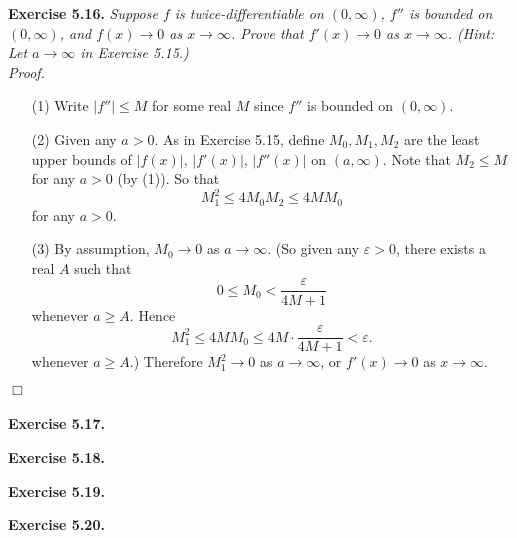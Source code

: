 \documentclass{article}
\begin{document}
\textbf{Exercise 5.16.}
\emph{Suppose $f$ is twice-differentiable on $(0,\infty)$,
$f''$ is bounded on $(0,\infty)$,
and $f(x) \to 0$ as $x \to \infty$.
Prove that $f'(x) \to 0$ as $x \to \infty$.
(Hint: Let $a \to \infty$ in Exercise 5.15.)} \\

\emph{Proof.}
\begin{enumerate}
\item[(1)]
Write $|f''| \leq M$ for some real $M$ since $f''$ is bounded on $(0,\infty)$.

\item[(2)]
Given any $a > 0$.
As in Exercise 5.15, define $M_0, M_1, M_2$ are the least upper bounds of
$|f(x)|$, $|f'(x)|$, $|f''(x)|$ on $(a,\infty)$.
Note that $M_2 \leq M$ for any $a > 0$ (by (1)).
So that
\[
  M_1^2 \leq 4 M_0 M_2 \leq 4M M_0
\]
for any $a > 0$.

\item[(3)]
By assumption, $M_0 \to 0$ as $a \to \infty$.
(So given any $\varepsilon > 0$, there exists a real $A$ such that
\[
  0 \leq M_0 < \frac{\varepsilon}{4M + 1}
\]
whenever $a \geq A$.
Hence
\[
  M_1^2 \leq 4M M_0 \leq 4M \cdot \frac{\varepsilon}{4M + 1} < \varepsilon.
\]
whenever $a \geq A$.)
Therefore $M_1^2 \to 0$ as $a \to \infty$,
or $f'(x) \to 0$ as $x \to \infty$.
\end{enumerate}
$\Box$ \\\\






\textbf{Exercise 5.17.}






\textbf{Exercise 5.18.}






\textbf{Exercise 5.19.}






\textbf{Exercise 5.20.}
\end{document}
